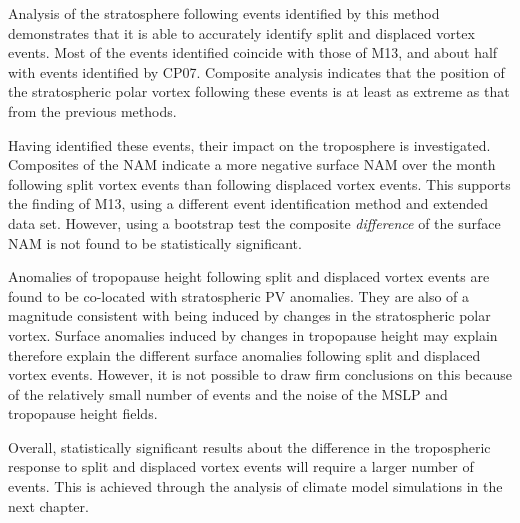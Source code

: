 Analysis of the stratosphere following events identified by this method
demonstrates that it is able to accurately identify split and displaced vortex
events. Most of the events identified coincide with those of M13, and about
half with events identified by CP07. Composite analysis indicates that the
position of the stratospheric polar vortex following these events is at least as
extreme as that from the previous methods. 

Having identified these events, their impact on the troposphere is
investigated. Composites of the NAM indicate a more negative surface NAM over
the month following split vortex events than following displaced vortex
events. This supports the finding of M13, using a different event identification
method and extended data set. However, using a bootstrap test the composite
\emph{difference} of the surface NAM is not found to be statistically
significant.

Anomalies of tropopause height following split and displaced vortex events are
found to be co-located with stratospheric PV anomalies. They are also of a
magnitude consistent with being induced by changes in the stratospheric polar
vortex. Surface anomalies induced by changes in tropopause height may explain
therefore explain the different surface anomalies following split and displaced
vortex events. However, it is not possible to draw firm conclusions on this
because of the relatively small number of events and the noise of the MSLP and
tropopause height fields.

Overall, statistically significant results about the difference in the
tropospheric response to split and displaced vortex events will require a larger
number of events. This is achieved through the analysis of climate model
simulations in the next chapter.  



















